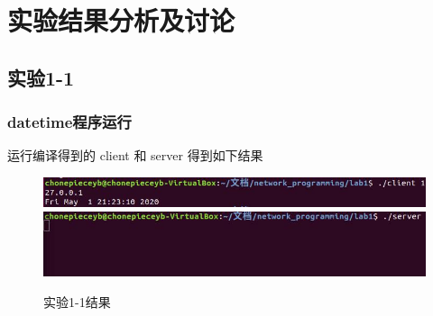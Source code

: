 \documentclass[a4paper,UTF8]{ctexart}
\begin{document}
	\section {实验结果分析及讨论}
		\subsection{实验1-1}
		\subsubsection{datetime程序运行}
			运行编译得到的 client 和 server 得到如下结果
			\begin{figure}[h]
				\includegraphics[scale =0.7]{./resources/1.jpg}
				\includegraphics[scale =0.7]{./resources/2.jpg}
				\caption{实验1-1结果}
				\end{figure}
\end{document}
